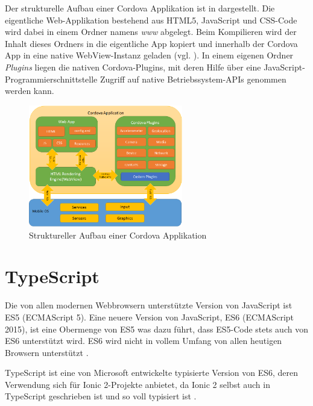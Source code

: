 Der strukturelle Aufbau einer Cordova Applikation ist in  dargestellt.
Die eigentliche Web-Applikation bestehend aus HTML5, JavaScript und CSS-Code wird dabei in einem Ordner namens \emph{www} abgelegt. Beim Kompilieren wird der Inhalt dieses Ordners in die eigentliche App kopiert und innerhalb der Cordova App in eine native WebView-Instanz geladen (vgl. ). In einem eigenen Ordner \emph{Plugins} liegen die nativen Cordova-Plugins, mit deren Hilfe über eine JavaScript-Programmierschnittstelle Zugriff auf native Betriebssystem-APIs genommen werden kann.
%
\begin{figure}[htb] 
	\centering
	\includegraphics[width=0.6\textwidth]{data/bilder/cordovaapparchitecture.png}
	\caption{Struktureller Aufbau einer Cordova Applikation \cite{cordovaApplicationArchitecture}}
	\label{fig:Cordovaapparchitecture}
\end{figure}
%
%
\section{TypeScript}
%
Die von allen modernen Webbrowsern unterstützte Version von JavaScript ist ES5 (ECMAScript 5).
Eine neuere Version von JavaScript, ES6 (ECMAScript 2015), ist eine Obermenge von ES5 was dazu führt, dass ES5-Code stets auch von ES6 unterstützt wird. ES6 wird nicht in vollem Umfang von allen heutigen Browsern unterstützt \cite{compatTableES6}.

TypeScript ist eine von Microsoft entwickelte typisierte Version von ES6, deren Verwendung sich für Ionic 2-Projekte anbietet, da Ionic 2 selbst auch in TypeScript geschrieben ist und so voll typisiert ist \cite{ionic2Docu}.

